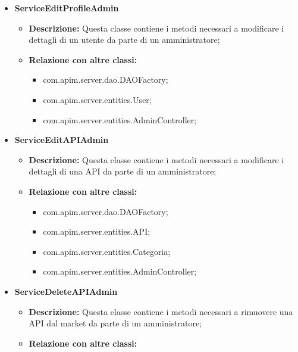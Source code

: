 {{{\begin{itemize}
\begin{itemize}
\begin{itemize}
              \item com.apim.server.entities.AdminController;
            \end{itemize}
          \end{itemize}
          \item \textbf{ServiceEditProfileAdmin}
          \begin{itemize}
            \item \textbf{Descrizione:} Questa classe contiene i metodi necessari a modificare i dettagli di un utente da parte di un amministratore;
            \item \textbf{Relazione con altre classi:}
            \begin{itemize}
              \item com.apim.server.dao.DAOFactory;
              \item com.apim.server.entities.User;
              \item com.apim.server.entities.AdminController;
            \end{itemize}
          \end{itemize}
          \item \textbf{ServiceEditAPIAdmin}
          \begin{itemize}
            \item \textbf{Descrizione:} Questa classe contiene i metodi necessari a modificare i dettagli di una API da parte di un amministratore;
            \item \textbf{Relazione con altre classi:}
            \begin{itemize}
              \item com.apim.server.dao.DAOFactory;
              \item com.apim.server.entities.API;
              \item com.apim.server.entities.Categoria;
              \item com.apim.server.entities.AdminController;
            \end{itemize}
          \end{itemize}
          \item \textbf{ServiceDeleteAPIAdmin}
          \begin{itemize}
            \item \textbf{Descrizione:} Questa classe contiene i metodi necessari a rimuovere una API dal market da parte di un amministratore;
            \item \textbf{Relazione con altre classi:}
            \begin{itemize}

\end{itemize}
\end{itemize}
\end{itemize}}}}

